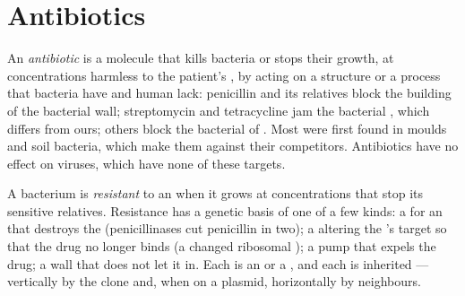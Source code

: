 \section{Antibiotics}

\begin{definition}[Antibiotic]\label{def:g11:antibiotic-resistance:antibiotic}
An \emph{antibiotic} is a molecule that kills
bacteria or stops their growth, at concentrations harmless to the
patient's , by acting on a structure or a process that bacteria
have and human  lack: penicillin and its relatives block the
building of the bacterial wall; streptomycin and tetracycline jam the
bacterial , which differs from ours; others block the
bacterial  of . Most were first found in
moulds and soil bacteria, which make them against their competitors.
Antibiotics have no effect on viruses, which have none of these
targets.
\end{definition}

\begin{proposition}\label{prop:g11:antibiotic-resistance:mechanisms}
A bacterium is \emph{resistant} to an
 when it grows at concentrations that stop its sensitive
relatives. Resistance has a genetic basis of one of a few kinds: a
 for an  that destroys the  (penicillinases cut
penicillin in two); a  altering the 's target so
that the drug no longer binds (a changed ribosomal ); a pump
that expels the drug; a wall that does not let it in. Each is an
 or a , and each is inherited --- vertically by the clone
and, when on a plasmid, horizontally by neighbours.
\end{proposition}
\admitted

